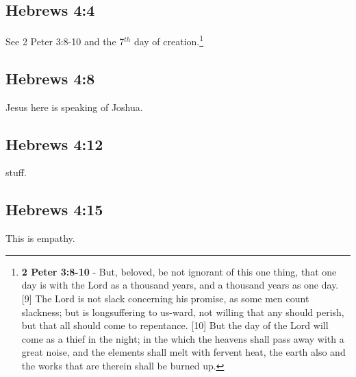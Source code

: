 \subsection{Hebrews 4:4}
See 2 Peter 3:8-10 and the 7$^{th}$ day of creation.\footnote{\textbf{2 Peter 3:8-10} - But, beloved, be not ignorant of this one thing, that one day is with the Lord as a thousand years, and a thousand years as one day. [9] The Lord is not slack concerning his promise, as some men count slackness; but is longsuffering to us-ward, not willing that any should perish, but that all should come to repentance. [10] But the day of the Lord will come as a thief in the night; in the which the heavens shall pass away with a great noise, and the elements shall melt with fervent heat, the earth also and the works that are therein shall be burned up.} 

\subsection{Hebrews 4:8}
Jesus here is speaking of Joshua.

\subsection{Hebrews 4:12}
stuff.%

\subsection{Hebrews 4:15}
This is empathy.
